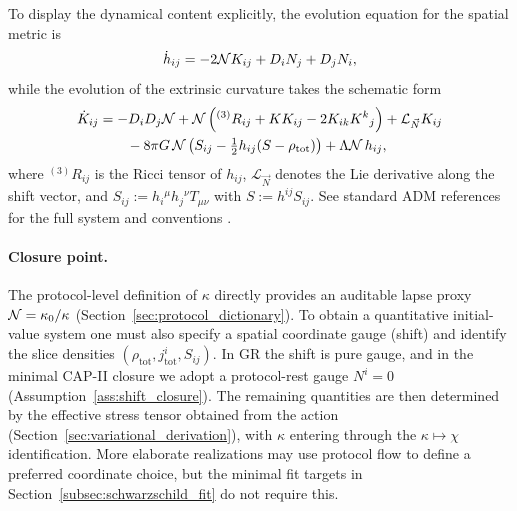 To display the dynamical content explicitly, the evolution equation for the spatial metric is
\begin{equation}
  \dot h_{ij} = -2\mathcal{N} K_{ij} + D_i N_j + D_j N_i,
  \label{eq:adm_hdot}
\end{equation}
while the evolution of the extrinsic curvature takes the schematic form
\begin{align}
  \dot K_{ij}
  &=
  -D_iD_j\mathcal{N}
  + \mathcal{N}\left({}^{(3)}R_{ij}+K K_{ij}-2K_{ik}K^k{}_j\right)
  + \mathcal{L}_{\vec N}K_{ij}
  \nonumber\\
  &\qquad
  -8\pi G\,\mathcal{N}\left(S_{ij}-\tfrac12 h_{ij}(S-\rho_{\mathrm{tot}})\right)
  + \Lambda \mathcal{N}\,h_{ij},
  \label{eq:adm_Kdot}
\end{align}
where ${}^{(3)}R_{ij}$ is the Ricci tensor of $h_{ij}$, $\mathcal{L}_{\vec N}$ denotes the Lie derivative along the shift vector, and $S_{ij}:=h_i{}^\mu h_j{}^\nu T_{\mu\nu}$ with $S:=h^{ij}S_{ij}$.
See standard ADM references for the full system and conventions \cite{ArnowittDeserMisner1962,Gourgoulhon2007}.

\paragraph{Closure point.}
The protocol-level definition of $\kappa$ directly provides an auditable lapse proxy $\mathcal{N}=\kappa_0/\kappa$ (Section~\ref{sec:protocol_dictionary}).
To obtain a quantitative initial-value system one must also specify a spatial coordinate gauge (shift) and identify the slice densities $(\rho_{\mathrm{tot}},j^i_{\mathrm{tot}},S_{ij})$.
In GR the shift is pure gauge, and in the minimal CAP-II closure we adopt a protocol-rest gauge $N^i=0$ (Assumption~\ref{ass:shift_closure}).
The remaining quantities are then determined by the effective stress tensor obtained from the action (Section~\ref{sec:variational_derivation}), with $\kappa$ entering through the $\kappa\mapsto\chi$ identification.
More elaborate realizations may use protocol flow to define a preferred coordinate choice, but the minimal fit targets in Section~\ref{subsec:schwarzschild_fit} do not require this.


